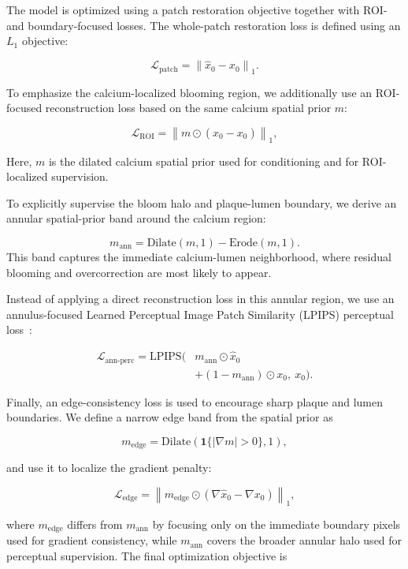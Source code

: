 \documentclass[singleLetter,times]{sagej}
\begin{document}
The model is optimized using a patch restoration objective together with ROI- and boundary-focused losses. The whole-patch restoration loss is defined using an $L_1$ objective:

\[
\mathcal{L}_{\mathrm{patch}}
=
\left\|
\hat{x}_0 - x_0
\right\|_1 .
\]

To emphasize the calcium-localized blooming region, we additionally use an ROI-focused reconstruction loss based on the same calcium spatial prior $m$:

\[
\mathcal{L}_{\mathrm{ROI}}
=
\left\|
m \odot
(\hat{x}_0-x_0)
\right\|_1 ,
\]

Here, $m$ is the dilated calcium spatial prior used for conditioning and for ROI-localized supervision.

To explicitly supervise the bloom halo and plaque-lumen boundary, we derive an annular spatial-prior band around the calcium region:

\[
m_{\mathrm{ann}}
=
\mathrm{Dilate}(m,1)
-
\mathrm{Erode}(m,1).
\]
This band captures the immediate calcium-lumen neighborhood, where residual blooming and overcorrection are most likely to appear.

Instead of applying a direct reconstruction loss in this annular region, we use an annulus-focused Learned Perceptual Image Patch Similarity (LPIPS) perceptual loss~\cite{zhang2018unreasonableeffectivenessdeepfeatures}:

\[
\begin{aligned}
\mathcal{L}_{\mathrm{ann\text{-}perc}}
=
\mathrm{LPIPS}\Big(
&m_{\mathrm{ann}}\odot \hat{x}_0 \\
&+ (1-m_{\mathrm{ann}})\odot x_0,\ x_0
\Big).
\end{aligned}
\]

Finally, an edge-consistency loss is used to encourage sharp plaque and lumen boundaries. We define a narrow edge band from the spatial prior as

\[
m_{\mathrm{edge}}
=
\mathrm{Dilate}\!\left(\mathbf{1}\{|\nabla m|>0\},1\right),
\]

and use it to localize the gradient penalty:

\[
\mathcal{L}_{\mathrm{edge}}
=
\left\|
m_{\mathrm{edge}} \odot
\left(
\nabla \hat{x}_0
-
\nabla x_0
\right)
\right\|_1 ,
\]

where $m_{\mathrm{edge}}$ differs from $m_{\mathrm{ann}}$ by focusing only on the immediate boundary pixels used for gradient consistency, while $m_{\mathrm{ann}}$ covers the broader annular halo used for perceptual supervision. The final optimization objective is
\end{document}
